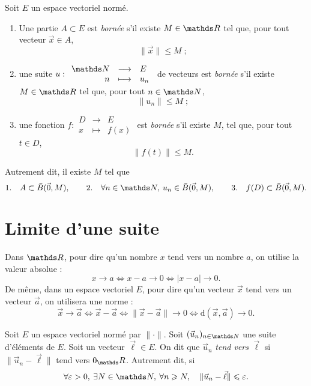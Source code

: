 \begin{defn}
	Soit $E$\/ un espace vectoriel normé.
	\begin{enumerate}
		\item Une partie $A \subset E$\/ est \textit{bornée} s'il existe $M \in \R$\/ tel que, pour tout vecteur $\vec{x} \in A$, \[\|\vec{x}\| \le M\;; \]
		\item une suite $u : \begin{array}{rcl} \N &\longrightarrow& E \\ n &\longmapsto& u_n \end{array}$ de vecteurs est \textit{bornée} s'il existe $M \in \R$\/ tel que, pour tout $n \in \N$, \[ \|u_n\|\le M \;; \]
		\item  une fonction $f : \begin{array}{rcl} D &\longrightarrow& E \\ x &\longmapsto& f(x) \end{array}$ est \textit{bornée} s'il existe $M$, tel que, pour tout $t \in D$, \[ \|f(t)\| \le M .\]
	\end{enumerate}
	Autrement dit, il existe $M$\/ tel que
	\[
		1.\quad A \subset \bar{B}(\vec{0}, M),\quad\quad 2.\quad \forall n \in \N,\: u_n \in \bar{B}(\vec{0}, M),\quad\quad 3.\quad f(D) \subset \bar{B}(\vec{0}, M)
	.\]
\end{defn}

\section{Limite d'une suite}

Dans $\R$, pour dire qu'un nombre $x$\/ tend vers un nombre $a$, on utilise la valeur absolue : \[
	x \to a \iff x - a \to 0 \iff |x-a| \to 0
.\] De même, dans un espace vectoriel $E$, pour dire qu'un vecteur $\vec{x}$\/ tend vers un vecteur $\vec{a}$, on utilisera une norme : \[
	\vec{x} \to \vec{a} \iff \vec{x} - \vec{a} \iff \|\vec{x} - \vec{a}\| \to 0 \iff \mathrm{d}(\vec{x}, \vec{a}) \to 0
.\]

\begin{defn}
	Soit $E$\/ un espace vectoriel normé par $\|\cdot\|$. 
	Soit $(\vec{u}_n)_{n\in\N}$\/ une suite d'éléments de $E$. Soit un vecteur $\vec{\ell} \in E$. On dit que $\vec{u}_n$\/ \textit{tend vers} $\vec{\ell}$\/ si $\|\vec{u}_n - \vec{\ell}\|$\/ tend vers $0_\R$. Autrement dit, si \[
		\forall \varepsilon > 0,\: \exists N \in \N,\: \forall n \ge N, \quad\|\vec{u}_n - \vec{\ell}\| \le \varepsilon
	.\]
\end{defn}

